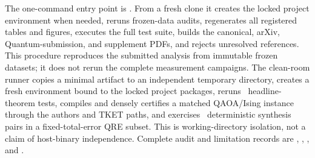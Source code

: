 \documentclass[a4paper,twocolumn,10pt,unpublished]{quantumarticle}
\begin{document}
The one-command entry point is
.  From a fresh clone it creates the
locked project environment when needed, reruns frozen-data audits, regenerates
all registered tables and figures, executes the full test suite, builds the
canonical, arXiv, Quantum-submission, and supplement PDFs, and rejects
unresolved references.  This procedure reproduces the submitted analysis from
immutable frozen datasets; it does not rerun the complete measurement
campaigns.  The clean-room runner
copies a minimal artifact to an independent temporary directory, creates a
fresh environment bound to the locked project packages, reruns
\CleanTheoryTests\ headline-theorem tests, compiles and densely certifies a
matched QAOA/Ising instance through the authors and TKET paths, and exercises
\CleanGridPairs\ deterministic synthesis pairs in a fixed-total-error QRE
subset.  This is working-directory isolation, not a claim of host-binary
independence.  Complete audit and limitation records are
, ,
, and .
\end{document}
